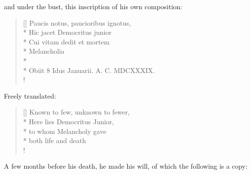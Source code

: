 and under the bust, this inscription of his own composition:

\settowidth{\versewidth}{Paucis notus, paucioribus ignotus,}
\begin{verse}[\versewidth]
Paucis notus, paucioribus ignotus,\\*
Hic jacet Democritus junior\\*
Cui vitam dedit et mortem\\*
Melancholia\\*
\hrulefill\\*
Obiit 8 Idus Januarii. A. C. MDCXXXIX.\\!
\end{verse}

Freely translated:

\settowidth{\versewidth}{Known to few, unknown to fewer,}
\begin{verse}[\versewidth]
Known to few, unknown to fewer,\\*
Here lies Democritus Junior,\\*
to whom Melancholy gave\\*
both life and death\\!
\end{verse}


A few months before his death, he made his will, of which the following is a copy:
\\


